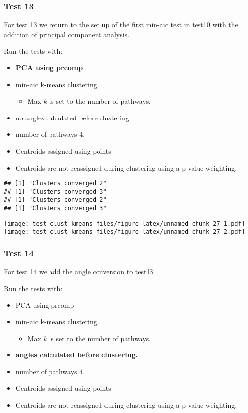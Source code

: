 \documentclass[
]{article}
\providecommand{\tightlist}{%
  \setlength{\itemsep}{0pt}\setlength{\parskip}{0pt}}
\begin{document}
\hypertarget{test13}{%
\subsubsection{Test 13}\label{test13}}

For test 13 we return to the set up of the first min-aic test in
\protect\hyperlink{test10}{test10} with the addition of principal
component analysis.

Run the tests with:

\begin{itemize}
\tightlist
\item
  \textbf{PCA using prcomp}
\item
  min-aic k-means clustering.

  \begin{itemize}
  \tightlist
  \item
    Max \(k\) is set to the number of pathways.
  \end{itemize}
\item
  no angles calculated before clustering.
\item
  number of pathways 4.
\item
  Centroids assigned using points
\item
  Centroids are not reassigned during clustering using a p-value
  weighting.
\end{itemize}

\begin{verbatim}
## [1] "Clusters converged 2"
## [1] "Clusters converged 3"
## [1] "Clusters converged 2"
## [1] "Clusters converged 3"
\end{verbatim}

\texttt{[image: test\_clust\_kmeans\_files/figure-latex/unnamed-chunk-27-1.pdf]}
\texttt{[image: test\_clust\_kmeans\_files/figure-latex/unnamed-chunk-27-2.pdf]}

\hypertarget{test14}{%
\subsubsection{Test 14}\label{test14}}

For test 14 we add the angle conversion to
\protect\hyperlink{test13}{test13}.

Run the tests with:

\begin{itemize}
\tightlist
\item
  PCA using prcomp
\item
  min-aic k-means clustering.

  \begin{itemize}
  \tightlist
  \item
    Max \(k\) is set to the number of pathways.
  \end{itemize}
\item
  \textbf{angles calculated before clustering.}
\item
  number of pathways 4.
\item
  Centroids assigned using points
\item
  Centroids are not reassigned during clustering using a p-value
  weighting.
\end{itemize}
\end{document}
